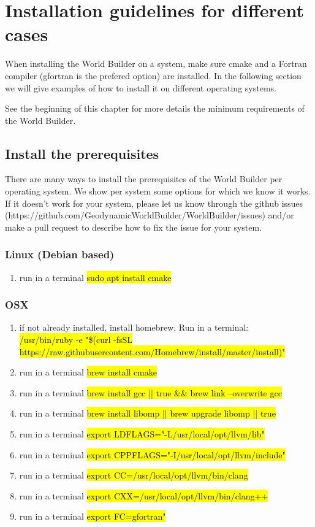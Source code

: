 \documentclass{book}
\newcommand{\WB}{{World Builder}}
\newcommand{\cmake}{{cmake}}
\begin{document}
\section{Installation guidelines for different cases}
\label{section:installation_for_different_cases}
When installing the \WB{} on a system, make sure \cmake{} and a Fortran compiler (gfortran is the prefered option) are installed. In the following section we will give examples of how to install it on different operating systems.
\begin{remark}
See the beginning of this chapter for more details the minimum requirements of the \WB{}.
\end{remark}

\subsection{Install the prerequisites}
There are many ways to install the prerequisites of the \WB{} per operating system. We show per system some options for which we know it works. If it doesn't work for your system, please let us know through the github issues (https://github.com/GeodynamicWorldBuilder/WorldBuilder/issues) and/or make a pull request to describe how to fix the issue for your system.
\subsubsection{Linux (Debian based)}
\begin{enumerate}
    \item run in a terminal \hl{sudo apt install cmake}
\end{enumerate}
\subsubsection{OSX}
\begin{enumerate}
    \item if not already installed, install homebrew. Run in a terminal:\\ \hl{/usr/bin/ruby -e "\$(curl -fsSL https://raw.githubusercontent.com/Homebrew/install/master/install)"}
    \item run in a terminal \hl{brew install cmake} 
    \item run in a terminal \hl{brew install gcc || true  \&\& brew link --overwrite gcc} 
    \item run in a terminal \hl{brew install libomp || brew upgrade libomp || true}
    \item run in a terminal \hl{export LDFLAGS="-L/usr/local/opt/llvm/lib"}
    \item run in a terminal \hl{export CPPFLAGS="-I/usr/local/opt/llvm/include"}
    \item run in a terminal \hl{export CC=/usr/local/opt/llvm/bin/clang}
    \item run in a terminal \hl{export  CXX=/usr/local/opt/llvm/bin/clang++}
    \item run in a terminal \hl{export FC=gfortran"}
\end{enumerate}
\end{document}
